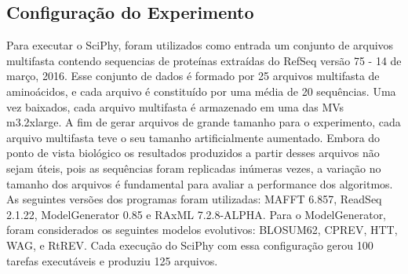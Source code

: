\subsection{Configuração do Experimento}

Para executar o SciPhy, foram utilizados como entrada um conjunto de arquivos multifasta contendo sequencias de proteínas extraídas do RefSeq versão 75 - 14 de março, 2016. Esse conjunto de dados é formado por 25 arquivos multifasta de aminoácidos, e cada arquivo é constituído por uma média de 20 sequências. Uma vez baixados, cada arquivo multifasta é armazenado em uma das MVs m3.2xlarge. A fim de gerar arquivos de grande tamanho para o experimento, cada arquivo multifasta teve o seu tamanho artificialmente aumentado. Embora do ponto de vista biológico os resultados produzidos a partir desses arquivos não sejam úteis, pois as sequências foram replicadas inúmeras vezes, a variação no tamanho dos arquivos é fundamental para avaliar a performance dos algoritmos. As seguintes versões dos programas foram utilizadas: MAFFT 6.857, ReadSeq 2.1.22, ModelGenerator 0.85 e RAxML 7.2.8-ALPHA. Para o ModelGenerator, foram considerados os seguintes modelos evolutivos: BLOSUM62, CPREV, HTT, WAG, e RtREV. Cada execução do SciPhy com essa configuração gerou 100 tarefas executáveis e produziu 125 arquivos.




